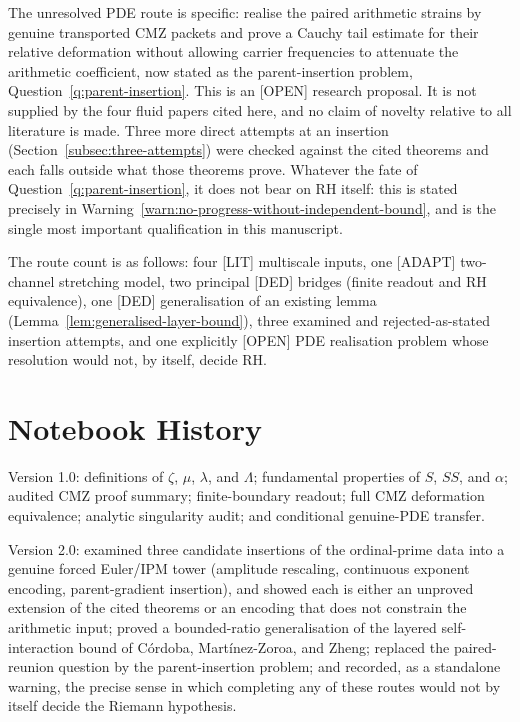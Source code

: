 \documentclass[11pt]{amsart}
\numberwithin{equation}{section}
\theoremstyle{plain}
\theoremstyle{definition}
\theoremstyle{remark}
\begin{document}
The unresolved PDE route is specific: realise the paired arithmetic strains
by genuine transported CMZ packets and prove a Cauchy tail estimate for their
relative deformation without allowing carrier frequencies to attenuate the
arithmetic coefficient, now stated as the parent-insertion problem,
Question~\ref{q:parent-insertion}.  This is an \textup{[OPEN]} research
proposal.  It is not supplied by the four fluid papers cited here, and no
claim of novelty relative to all literature is made.  Three more direct
attempts at an insertion (Section~\ref{subsec:three-attempts}) were checked
against the cited theorems and each falls outside what those theorems prove.
Whatever the fate of Question~\ref{q:parent-insertion}, it does not bear on
RH itself: this is stated precisely in
Warning~\ref{warn:no-progress-without-independent-bound}, and is the single
most important qualification in this manuscript.

The route count is as follows: four \textup{[LIT]} multiscale inputs, one
\textup{[ADAPT]} two-channel stretching model, two principal \textup{[DED]}
bridges (finite readout and RH equivalence), one \textup{[DED]}
generalisation of an existing lemma (Lemma~\ref{lem:generalised-layer-bound}),
three examined and rejected-as-stated insertion attempts, and one explicitly
\textup{[OPEN]} PDE realisation problem whose resolution would not, by
itself, decide RH.

\section*{Notebook History}
\label{sec:notebook-history}

Version 1.0: definitions of $\zeta$, $\mu$, $\lambda$, and $\Lambda$;
fundamental properties of $S$, $SS$, and $\alpha$; audited CMZ proof summary;
finite-boundary readout; full CMZ deformation equivalence; analytic
singularity audit; and conditional genuine-PDE transfer.

Version 2.0: examined three candidate insertions of the ordinal-prime data
into a genuine forced Euler/IPM tower (amplitude rescaling, continuous
exponent encoding, parent-gradient insertion), and showed each is either an
unproved extension of the cited theorems or an encoding that does not
constrain the arithmetic input; proved a bounded-ratio generalisation of the
layered self-interaction bound of C\'ordoba, Mart\'inez-Zoroa, and Zheng;
replaced the paired-reunion question by the parent-insertion problem; and
recorded, as a standalone warning, the precise sense in which completing any
of these routes would not by itself decide the Riemann hypothesis.
\end{document}
